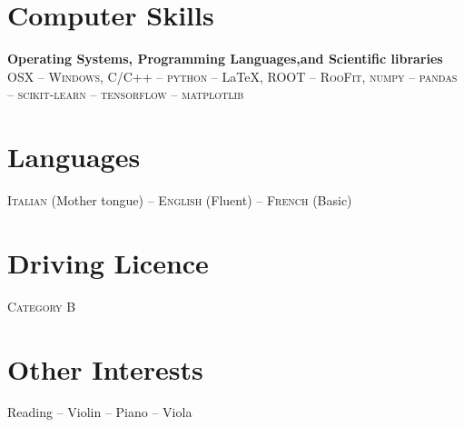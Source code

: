\documentclass[11pt]{res}
\newcommand{\MarginText}[1]{\section{#1}\vspace{10pt}}
\begin{document}
\begin{resume}


											    














\MarginText{Computer Skills}\vspace{.5em}
\textbf{Operating Systems, Programming Languages,and Scientific libraries} 
\textsc{OSX} -- \textsc{Windows}, \textsc{C/C++} -- \textsc{python} -- \LaTeX, \textsc{ROOT} -- \textsc{RooFit}, \textsc{numpy} -- \textsc{pandas} -- \textsc{scikit-learn} -- \textsc{tensorflow} -- \textsc{matplotlib}
\MarginText{Languages}
\textsc{Italian} (Mother tongue) --  \textsc{English} (Fluent) -- \textsc{French} (Basic)
\MarginText{Driving Licence} \textsc{Category B}
\MarginText{Other Interests} Reading -- Violin -- Piano -- Viola



\end{resume}
\end{document}
